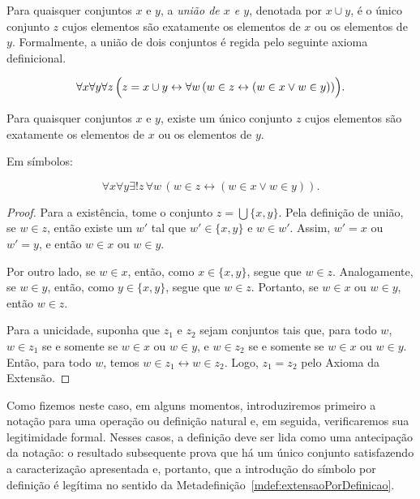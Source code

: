 \begin{definition}[$\BST$]\label{def:uniaoBinaria}
    Para quaisquer conjuntos $x$ e $y$, a \emph{união de $x$ e $y$}, denotada por $x\cup y$, é o único conjunto $z$ cujos elementos são exatamente os elementos de $x$ ou os elementos de $y$.
    Formalmente, a união de dois conjuntos é regida pelo seguinte axioma definicional.

    \[
        \forall x \forall y \forall z\, \Bigl(z = x \cup y \leftrightarrow \forall w\, (w \in z \leftrightarrow (w \in x \lor w \in y))\Bigr).
    \]
\end{definition}

\begin{lemma}[$\BST$]\label{lem:existenciaDaUniaoBinaria}
    Para quaisquer conjuntos $x$ e $y$, existe um único conjunto $z$ cujos elementos são exatamente os elementos de $x$ ou os elementos de $y$.

    Em símbolos:

    \[
        \forall x \forall y \exists! z\, \forall w\, (w \in z \leftrightarrow (w \in x \lor w \in y)).
    \]
\end{lemma}
\begin{proof}
    Para a existência, tome o conjunto $z = \bigcup \{ x, y \}$.
    Pela definição de união, se $w \in z$, então existe um $w'$ tal que $w' \in \{ x, y \}$ e $w \in w'$.
    Assim, $w' = x$ ou $w' = y$, e então $w \in x$ ou $w \in y$.

    Por outro lado, se $w \in x$, então, como $x \in \{x,y\}$, segue que $w \in z$.
    Analogamente, se $w \in y$, então, como $y \in \{x,y\}$, segue que $w \in z$.
    Portanto, se $w \in x$ ou $w \in y$, então $w \in z$.

    Para a unicidade, suponha que $z_1$ e $z_2$ sejam conjuntos tais que, para todo $w$, $w \in z_1$ se e somente se $w \in x$ ou $w \in y$, e $w \in z_2$ se e somente se $w \in x$ ou $w \in y$.
    Então, para todo $w$, temos $w \in z_1 \leftrightarrow w \in z_2$.
    Logo, $z_1 = z_2$ pelo Axioma da Extensão.
\end{proof}

Como fizemos neste caso, em alguns momentos, introduziremos primeiro a notação para uma operação ou definição natural e, em seguida, verificaremos sua legitimidade formal.
Nesses casos, a definição deve ser lida como uma antecipação da notação: o resultado subsequente prova que há um único conjunto satisfazendo a caracterização apresentada e, portanto, que a introdução do símbolo por definição é legítima no sentido da Metadefinição~\ref{mdef:extensaoPorDefinicao}.

